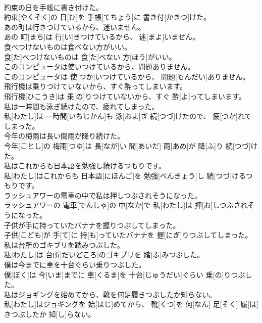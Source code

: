\documentclass[8pt]{extreport}
\begin{document}
\begin{CJK}{UTF8}{min}
\\	約束の日を手帳に書き付けた。	
\\	約束[やくそく]の 日[ひ]を 手帳[てちょう]に 書き付[かきつ]けた。
\\	あの町は行きつけているから、迷いません。	
\\	あの 町[まち]は 行[い]きつけているから、 迷[まよ]いません。
\\	食べつけないものは食べない方がいい。	
\\	食[た]べつけないものは 食[た]べない 方[ほう]がいい。
\\	このコンピュータは使いつけているから、問題ありません。	
\\	このコンピュータは 使[つか]いつけているから、 問題[もんだい]ありません。
\\	飛行機は乗りつけていないから、すぐ酔ってしまいます。	
\\	飛行機[ひこうき]は 乗[の]りつけていないから、すぐ 酔[よ]ってしまいます。
\\	私は一時間も泳ぎ続けたので、疲れてしまった。	
\\	私[わたし]は 一時間[いちじかん]も 泳[およ]ぎ 続[つづ]けたので、 疲[つか]れてしまった。
\\	今年の梅雨は長い間雨が降り続けた。	
\\	今年[ことし]の 梅雨[つゆ]は 長[なが]い 間[あいだ] 雨[あめ]が 降[ふ]り 続[つづ]けた。
\\	私はこれからも日本語を勉強し続けるつもりです。	
\\	私[わたし]はこれからも 日本語[にほんご]を 勉強[べんきょう]し 続[つづ]けるつもりです。
\\	ラッシュアワーの電車の中で私は押しつぶされそうになった。	
\\	ラッシュアワーの 電車[でんしゃ]の 中[なか]で 私[わたし]は 押[お]しつぶされそうになった。
\\	子供が手に持っていたバナナを握りつぶしてしまった。	
\\	子供[こども]が 手[て]に 持[も]っていたバナナを 握[にぎ]りつぶしてしまった。
\\	私は台所のゴキブリを踏みつぶした。	
\\	私[わたし]は 台所[だいどころ]のゴキブリを 踏[ふ]みつぶした。
\\	僕は今までに車を十台ぐらい乗りつぶした。	
\\	僕[ぼく]は 今[いま]までに 車[くるま]を 十台[じゅうだい]ぐらい 乗[の]りつぶした。
\\	私はジョギングを始めてから、靴を何足履きつぶしたか知らない。	
\\	私[わたし]はジョギングを 始[はじ]めてから、 靴[くつ]を 何[なん] 足[そく] 履[は]きつぶしたか 知[し]らない。

\end{CJK}
\end{document}
